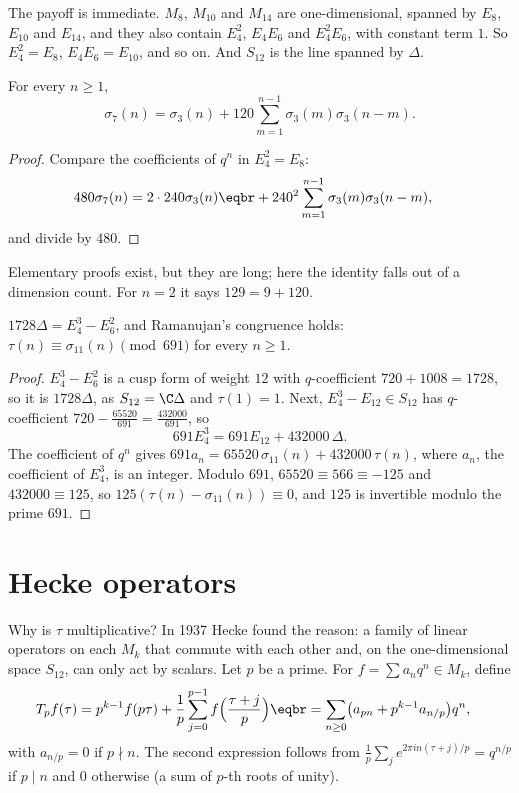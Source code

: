The payoff is immediate. $M_8$, $M_{10}$ and $M_{14}$ are one-dimensional, spanned by $E_8$, $E_{10}$ and $E_{14}$, and they also contain $E_4^2$, $E_4E_6$ and $E_4^2E_6$, with constant term $1$. So $E_4^2=E_8$, $E_4E_6=E_{10}$, and
so on. And $S_{12}$ is the line spanned by $\Delta$.

\begin{corollary}\label{cor:sigma7}
For every $n\ge1$,
\[
\sigma_7(n)=\sigma_3(n)+120\sum_{m=1}^{n-1}\sigma_3(m)\sigma_3(n-m).
\]
\end{corollary}

\begin{proof}
Compare the coefficients of $q^n$ in $E_4^2=E_8$:
\[
\begin{aligned}480\sigma_7(n)&=2\cdot240\sigma_3(n)\eqbr+240^2\sum_{m=1}^{n-1}\sigma_3(m)\sigma_3(n-m),\end{aligned}
\]
and divide by $480$.
\end{proof}

Elementary proofs exist, but they are long; here the identity falls out of a dimension count. For $n=2$ it says $129=9+120$.

\begin{corollary}\label{cor:delta}
$1728\Delta=E_4^3-E_6^2$, and Ramanujan's congruence holds: $\tau(n)\equiv\sigma_{11}(n)\pmod{691}$ for every $n\ge1$.
\end{corollary}

\begin{proof}
$E_4^3-E_6^2$ is a cusp form of weight $12$ with $q$-coefficient $720+1008=1728$, so it is $1728\Delta$, as $S_{12}=\C\Delta$ and $\tau(1)=1$. Next, $E_4^3-E_{12}\in S_{12}$ has $q$-coefficient $720-\frac{65520}{691}=\frac{432000}{691}$, so
\[
691E_4^3=691E_{12}+432000\,\Delta.
\]
The coefficient of $q^n$ gives $691a_n=65520\,\sigma_{11}(n)+432000\,\tau(n)$, where $a_n$, the coefficient of $E_4^3$, is an integer. Modulo $691$, $65520\equiv566\equiv-125$ and $432000\equiv125$, so
$125(\tau(n)-\sigma_{11}(n))\equiv0$, and $125$ is invertible modulo the prime $691$.
\end{proof}

\section{Hecke operators}

Why is $\tau$ multiplicative? In 1937 Hecke found the reason: a family of linear operators on each $M_k$ that commute with each other and, on the one-dimensional space $S_{12}$, can only act by scalars. Let $p$ be a prime.
For $f=\sum a_nq^n\in M_k$, define
\[
\begin{aligned}T_pf(\tau)&=p^{k-1}f(p\tau)+\frac1p\sum_{j=0}^{p-1}f\Bigl(\frac{\tau+j}p\Bigr)\eqbr=\sum_{n\ge0}\bigl(a_{pn}+p^{k-1}a_{n/p}\bigr)q^n,\end{aligned}
\]
with $a_{n/p}=0$ if $p\nmid n$. The second expression follows from $\frac1p\sum_je^{2\pi in(\tau+j)/p}=q^{n/p}$ if $p\mid n$ and $0$ otherwise (a sum of $p$-th roots of unity).

